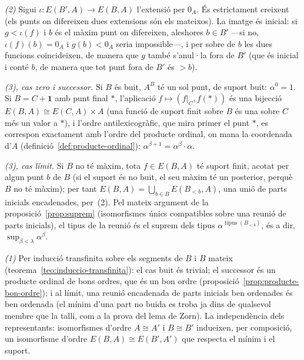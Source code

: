 \begin{prova}
\emph{(2)} Sigui \(\iota\colon E(B',A)\to E(B,A)\) l'extensió per \(0_A\).
És estrictament creixent (els punts on difereixen dues extensions són els
mateixos). La imatge és inicial: si \(g<\iota(f)\) i \(b\) és el màxim punt
on difereixen, aleshores \(b\in B'\) ---si no, \(\iota(f)(b)=0_A\) i
\(g(b)<0_A\) seria impossible---, i per sobre de \(b\) les dues funcions
coincideixen, de manera que \(g\) també s'anul·la fora de \(B'\) (que és
inicial i conté \(b\), de manera que tot punt fora de \(B'\) és \(>b\)).

\emph{(3), cas zero i successor.} Si \(B\) és buit, \(A^{B}\) té un sol
punt, de suport buit: \(\alpha^0=1\). Si \(B=C+\mathbf1\) amb punt final
\(\ast\), l'aplicació \(f\mapsto(f|_C,f(\ast))\) és una bijecció
\(E(B,A)\cong E(C,A)\times A\) (una funció de suport finit sobre \(B\) és
una sobre \(C\) més un valor a \(\ast\)), i l'ordre antilexicogràfic, que
mira primer el punt \(\ast\), es correspon exactament amb l'ordre del
producte ordinal, on mana la coordenada d'\(A\)
(definició~\ref{def:producte-ordinal}): \(\alpha^{\beta+1}=\alpha^{\beta}\cdot\alpha\).

\emph{(3), cas límit.} Si \(B\) no té màxim, tota \(f\in E(B,A)\) té suport
finit, acotat per algun punt \(b\) de \(B\) (si el suport és no buit, el seu
màxim té un posterior, perquè \(B\) no té màxim); per tant
\(E(B,A)=\bigcup_{b\in B}E(B_{<b},A)\), una unió de parts inicials
encadenades, per~(2). Pel mateix argument de la proposició~\ref{prop:suprem}
(isomorfismes únics compatibles sobre una reunió de parts inicials), el tipus
de la reunió és el suprem dels tipus \(\alpha^{\operatorname{tipus}(B_{<b})}\),
és a dir, \(\sup_{\beta<\lambda}\alpha^{\beta}\).

\emph{(1)} Per inducció transfinita sobre els segments de \(B\) i \(B\)
mateix (teorema~\ref{teo:induccio-transfinita}): el cas buit és trivial; el
successor és un producte ordinal de bons ordres, que és un bon ordre
(proposició~\ref{prop:producte-bon-ordre}); i al límit, una reunió
encadenada de parts inicials ben ordenades és ben ordenada (el mínim d'una
part no buida es troba ja dins de qualsevol membre que la talli, com a la
prova del lema de Zorn). La independència dels representants: isomorfismes
d'ordre \(A\cong A'\) i \(B\cong B'\) indueixen, per composició, un
isomorfisme d'ordre \(E(B,A)\cong E(B',A')\) que respecta el mínim i el
suport.
\end{prova}

